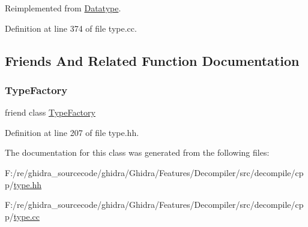 Reimplemented from \mbox{\hyperlink{class_datatype_a33339824f1c50d4354952296070c3902}{Datatype}}.



Definition at line 374 of file type.\+cc.



\subsection{Friends And Related Function Documentation}
\mbox{\label{class_type_void_ac8c1945d0a63785e78b3e09a13226ed6}} 
\subsubsection{\texorpdfstring{TypeFactory}{TypeFactory}}
{\footnotesize\ttfamily friend class \mbox{\hyperlink{class_type_factory}{Type\+Factory}}\hspace{0.3cm}{\ttfamily [friend]}}



Definition at line 207 of file type.\+hh.



The documentation for this class was generated from the following files\+:\begin{DoxyCompactItemize}
\item 
F\+:/re/ghidra\+\_\+sourcecode/ghidra/\+Ghidra/\+Features/\+Decompiler/src/decompile/cpp/\mbox{\hyperlink{type_8hh}{type.\+hh}}\item 
F\+:/re/ghidra\+\_\+sourcecode/ghidra/\+Ghidra/\+Features/\+Decompiler/src/decompile/cpp/\mbox{\hyperlink{type_8cc}{type.\+cc}}\end{DoxyCompactItemize}
